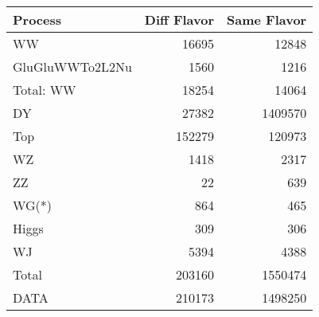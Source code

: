 \begin{table}[ht]
	\centering
\begin{tabular}{lrr}

         Process &  Diff Flavor &  Same Flavor \\
		\hline
              WW &        16695 &        12848 \\
 GluGluWWTo2L2Nu &         1560 &         1216 \\
\hline
       Total: WW &        18254 &        14064 \\
              DY &        27382 &      1409570 \\
             Top &       152279 &       120973 \\
              WZ &         1418 &         2317 \\
              ZZ &           22 &          639 \\
           WG(*) &          864 &          465 \\
           Higgs &          309 &          306 \\
              WJ &         5394 &         4388 \\
\hline
           Total &       203160 &      1550474 \\
            DATA &       210173 &      1498250 \\


\end{tabular}

\end{table}